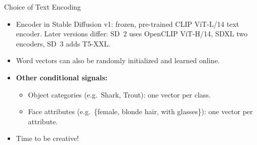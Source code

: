 \begin{frame}{Choice of Text Encoding}
      \begin{itemize}
        \item Encoder in Stable Diffusion v1: frozen, pre-trained CLIP ViT-L/14 text encoder. Later versions differ: SD~2 uses OpenCLIP ViT-H/14, SDXL two encoders, SD~3 adds T5-XXL.
        \item Word vectors can also be randomly initialized and learned online.
        \item \textbf{Other conditional signals:}
        \begin{itemize}
          \item Object categories (e.g.\ Shark, Trout): one vector per class.
          \item Face attributes (e.g.\ \{female, blonde hair, with glasses\}): one vector per attribute.
        \end{itemize}
        \item Time to be creative!
      \end{itemize}
\end{frame}
